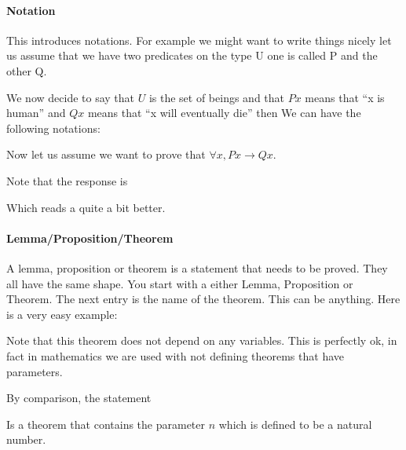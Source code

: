  \paragraph{\bf Notation}{  
 This introduces notations. For example we might want to write things nicely let us assume that we have two predicates on the type U one is called P and the other Q.
 
 We now decide to say that $U$ is the set of beings  and that $P x$ means that ``x is human'' and  $Q x $ means that ``x will eventually die'' then
 We can have the following notations:
 

Now let us assume we want to prove that $\forall x, P x \rightarrow Q x$.


Note that the response is


Which reads a quite a bit better.

 
 
 
  }
  
  
     
  
\paragraph{\bf Lemma/Proposition/Theorem}
{

A lemma, proposition or theorem is a statement that needs to be proved. They all have the same shape. You start with a either Lemma, Proposition or Theorem. The next entry is the name of the theorem. This can be anything. Here is a very easy example:





Note that this theorem does not depend on any variables. This is perfectly ok, in fact in mathematics we are used with not defining theorems that have parameters.

By comparison, the statement


Is a theorem that contains the parameter $n$ which is defined to be a natural number. }

